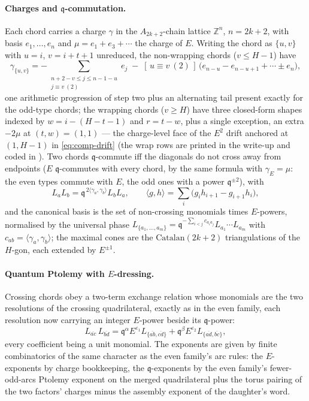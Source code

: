 \documentclass[11pt]{amsart}
\newcommand\fq{\mathfrak{q}}
\newcommand\bZ{\mathbb{Z}}
\theoremstyle{remark}
\begin{document}
\paragraph{Charges and $\fq$-commutation.}  Each chord carries a charge
$\gamma$ in the $A_{2k+2}$-chain lattice $\bZ^n$, $n=2k+2$, with basis
$e_1,\dots,e_n$ and $\mu=e_1+e_3+\cdots$ the charge of $E$.  Writing the
chord as $\{u,v\}$ with $u=i$, $v=i+t+1$ unreduced, the non-wrapping
chords ($v\le H-1$) have
\begin{equation}\label{eq:comp-charge}
  \gamma_{\{u,v\}}=-\!\!\sum_{\substack{n+2-v\le j\le n-1-u\\ j\equiv v\ (2)}}\!\! e_j
  \;-\;[\,u\equiv v\ (2)\,]\,\bigl(e_{n-u}-e_{n-u+1}+\cdots\pm e_n\bigr),
\end{equation}
one arithmetic progression of step two plus an alternating tail present
exactly for the odd-type chords; the wrapping chords ($v\ge H$) have
three closed-form shapes indexed by $w=i-(H-t-1)$ and $r=t-w$, plus a
single exception, an extra $-2\mu$ at $(t,w)=(1,1)$ --- the charge-level
face of the $E^2$ drift anchored at $(1,H-1)$ in \eqref{eq:comp-drift} (the wrap rows are
printed in the write-up and coded in ).  Two chords
$\fq$-commute iff the diagonals do not cross away from endpoints ($E$
$\fq$-commutes with every chord, by the same formula with $\gamma_E=\mu$:
the even types commute with $E$, the odd ones with a power $\fq^{\pm2}$), with
\begin{equation}\label{eq:comp-qcomm}
  L_aL_b=\fq^{\,2\langle\gamma_a,\gamma_b\rangle}L_bL_a,\qquad
  \langle g,h\rangle=\textstyle\sum_i\bigl(g_ih_{i+1}-g_{i+1}h_i\bigr),
\end{equation}
and the canonical basis is the set of non-crossing monomials times
$E$-powers, normalised by the universal phase
$L_{\{a_1,\dots,a_m\}}=\fq^{-\sum_{i<j}c_{a_ia_j}}L_{a_1}\cdots L_{a_m}$
with $c_{ab}=\langle\gamma_a,\gamma_b\rangle$; the maximal cones are the
$\mathrm{Catalan}(2k+2)$ triangulations of the $H$-gon, each extended by
$E^{\pm1}$.

\paragraph{Quantum Ptolemy with $E$-dressing.}  Crossing chords obey a
two-term exchange relation whose monomials are the two resolutions of
the crossing quadrilateral, exactly as in the even family, each
resolution now carrying an integer $E$-power beside its $\fq$-power:
\begin{equation}\label{eq:comp-ptolemy}
  L_{\overline{ac}}\,L_{\overline{bd}}
  =\fq^{\alpha}E^{\varepsilon_1}L_{\{\overline{ab},\overline{cd}\}}
  +\fq^{\beta}E^{\varepsilon_2}L_{\{\overline{ad},\overline{bc}\}},
\end{equation}
every coefficient being a unit monomial.  The exponents are given by
finite combinatorics of the same character as the even family's arc
rules: the $E$-exponents by charge bookkeeping, the $\fq$-exponents by
the even family's fewer-odd-arcs Ptolemy exponent on the merged
quadrilateral plus the torus pairing of the two factors' charges minus
the assembly exponent of the daughter's word.
\end{document}
